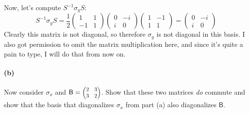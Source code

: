\documentclass{article}
\begin{document}
\begin{solution}
\[	\] 
	Now, let's compute $S^{-1}\sigma_y S$:
	\[
		S^{-1} \sigma_y S = \frac{1}{2}\begin{pmatrix} 1 &1 \\ -1 & 1  \end{pmatrix} \begin{pmatrix} 0 & -i\\ i & 0 \end{pmatrix} \begin{pmatrix} 1 & -1 \\ 1 & 1 \end{pmatrix} = \begin{pmatrix} 0 & -i \\i & 0 \end{pmatrix} 
	\] 
	Clearly this matrix is not diagonal, so therefore $\sigma_y$ is not diagonal in this basis. I also got 
	permission to omit the matrix multiplication here, and since it's quite a pain to type, I will do that from
	now on. 
\end{solution}
\paragraph{(b)}
Now consider $\sigma_{x}$ and $\mathsf{B}=\smmatrix{0.8}{2&3\\3&2}$.  Show that these two matrices \emph{do} commute and show that the basis that
diagonalizes $\sigma_{x}$ from part (a) also diagonalizes $\mathsf{B}$.
\end{document}
